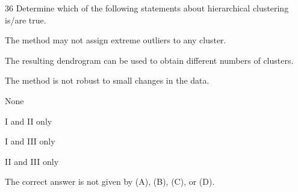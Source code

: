 \begin{question}{36}
Determine which of the following statements about hierarchical clustering is/are true.
\begin{statements}
\item The method may not assign extreme outliers to any cluster.
\item The resulting dendrogram can be used to obtain different numbers of clusters.
\item The method is not robust to small changes in the data.
\end{statements}

\begin{choices}
\item None
\item I and II only
\item I and III only
\item II and III only
\item The correct answer is not given by (A), (B), (C), or (D).
\end{choices}
\end{question}

